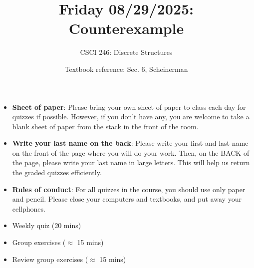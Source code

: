\documentclass[10pt]{beamer}
\begin{document}






\title{Friday 08/29/2025: Counterexample}
\author{CSCI 246: Discrete Structures}
\date{Textbook reference: Sec. 6, Scheinerman}

\begin{frame}
    \titlepage 
\end{frame}


\begin{frame}


\begin{mygreenbox}[title=Quiz Set up]
\begin{itemize}
\item \textbf{Sheet of paper}: Please bring your own sheet of paper to class each day for quizzes if possible. However, if you don't have any, you are welcome to take a blank sheet of paper from the stack in the front of the room.
\item \textbf{Write your last name on the back}: Please write your first and last name on the front of the page where you will do your work.  Then, on the BACK of the page, please write your last name in large letters. This will help us return the graded quizzes efficiently.
\item \textbf{Rules of conduct}: For all quizzes in the course, you should use only paper and pencil.  Please close your computers and textbooks, and put away your cellphones.     
\end{itemize}
\end{mygreenbox}

\vspace{-.2cm}


\begin{myyellowbox}[title=Today's Agenda]
\begin{itemize}
	\item Weekly quiz (20 mins)
	\item Group exercises ($\approx$ 15 mins)	
	\item Review group exercises ($\approx$ 15 mins)
\end{itemize}

\end{myyellowbox}



\end{frame}
\end{document}
